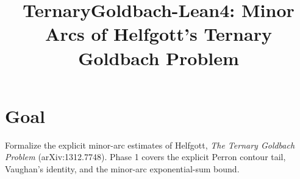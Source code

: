 \documentclass{report}
\begin{document}
\title{TernaryGoldbach-Lean4: Minor Arcs of Helfgott's Ternary Goldbach Problem}
\author{}
\maketitle

\section{Goal}

Formalize the explicit minor-arc estimates of Helfgott, \emph{The Ternary Goldbach
Problem} (arXiv:1312.7748). Phase 1 covers the explicit Perron contour tail, Vaughan's
identity, and the minor-arc exponential-sum bound.



\end{document}

